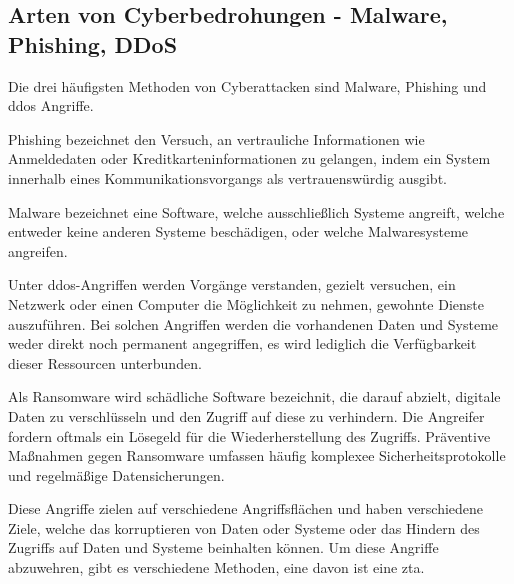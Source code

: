 \subsection[Arten von Cyberbedrohungen]{Arten von Cyberbedrohungen - Malware, Phishing, DDoS}\label{subsec:arten-von-cyberbedrohungen---malware-phishing-ddos}

Die drei häufigsten Methoden von Cyberattacken sind Malware, Phishing und \ac{ddos} Angriffe.

\begin{definition}
    \label{def:phishing}
    Phishing bezeichnet den Versuch, an vertrauliche Informationen wie Anmeldedaten oder Kreditkarteninformationen zu gelangen, indem ein System innerhalb eines Kommunikationsvorgangs als vertrauenswürdig ausgibt.\autocite[\vglf][]{study-on-phishing-attacks:2018}
\end{definition}

\begin{definition}
    \label{def:malware}
    Malware bezeichnet eine Software, welche ausschließlich Systeme angreift, welche entweder keine anderen Systeme beschädigen, oder welche Malwaresysteme angreifen.\autocite[\vglf][\pagef 108f.]{definition-malware-2010}
\end{definition}

\begin{definition}
    \label{def:ddos}
    Unter \ac{ddos}-Angriffen werden Vorgänge verstanden, gezielt versuchen, ein Netzwerk oder einen Computer die Möglichkeit zu nehmen, gewohnte Dienste auszuführen.
    Bei solchen Angriffen werden die vorhandenen Daten und Systeme weder direkt noch permanent angegriffen, es wird lediglich die Verfügbarkeit dieser Ressourcen unterbunden.\autocite[\vglf][]{ddos-definition-2003}
\end{definition}

\begin{definition}
    \label{def:ransomware}
    Als Ransomware wird schädliche Software bezeichnit, die darauf abzielt, digitale Daten zu verschlüsseln und den Zugriff auf diese zu verhindern.
    Die Angreifer fordern oftmals ein Lösegeld für die Wiederherstellung des Zugriffs.
    Präventive Maßnahmen gegen Ransomware umfassen häufig komplexee Sicherheitsprotokolle und regelmäßige Datensicherungen.
\end{definition}

Diese Angriffe zielen auf verschiedene Angriffsflächen und haben verschiedene Ziele, welche das korruptieren von Daten oder Systeme oder das Hindern des Zugriffs auf Daten und Systeme beinhalten können.
Um diese Angriffe abzuwehren, gibt es verschiedene Methoden, eine davon ist eine \ac{zta}.

